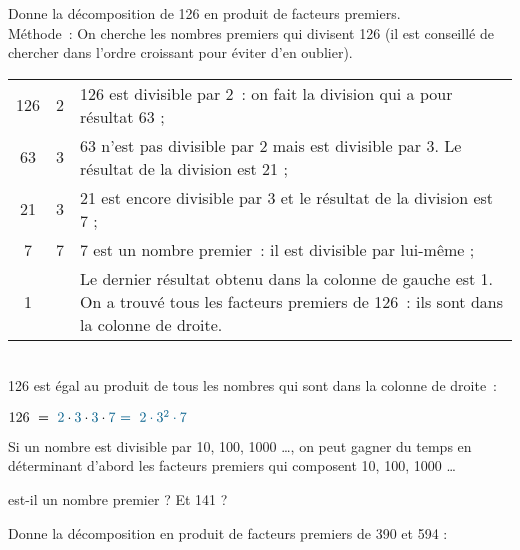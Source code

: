 \begin{methode*1}
 
\begin{exemple*1}
Donne la décomposition de 126 en produit de facteurs premiers.\\[1em]
Méthode : On cherche les nombres premiers qui divisent 126 (il est conseillé de chercher dans l'ordre croissant pour éviter d'en oublier). \\[1em]
\begin{tabularx}{\textwidth}{c|c|X}
 126 & \textcolor{A1}{2} & 126 est divisible par 2 : on fait la division qui a pour résultat 63 ; \\ 
 63 & \textcolor{A1}{3} & 63 n'est pas divisible par 2 mais est divisible par 3. Le résultat de la division est 21 ; \\
 21 & \textcolor{A1}{3} & 21 est encore divisible par 3 et le résultat de la division est 7 ; \\
7 & \textcolor{A1}{7} & 7 est un nombre premier : il est divisible par lui-même ; \\
1 & & Le dernier résultat obtenu dans la colonne de gauche est 1. On a trouvé tous les facteurs premiers de 126 : ils sont dans la colonne de droite. \\
\end{tabularx} \\[1em]
126 est égal au produit de tous les nombres qui sont dans la colonne de droite :
\begin{center} $126 = \textcolor{A1}{2} \cdot \textcolor{A1}{3} \cdot \textcolor{A1}{3} \cdot \textcolor{A1}{7} \textcolor{A1}{= 2 \cdot 3^2 \cdot 7}$ \end{center}
 \end{exemple*1}
 
\begin{remarque}
Si un nombre est divisible par 10, 100, 1000 \ldots, on peut gagner du temps en déterminant d'abord les facteurs premiers qui composent 10, 100, 1000 \ldots
\end{remarque}


 est-il un nombre premier ? Et 141 ?

\dotfill

\dotfill


\exercice  
Donne la décomposition en produit de facteurs premiers de 390 et 594 :

\dotfill

\dotfill

\dotfill

 \end{methode*1}
 
